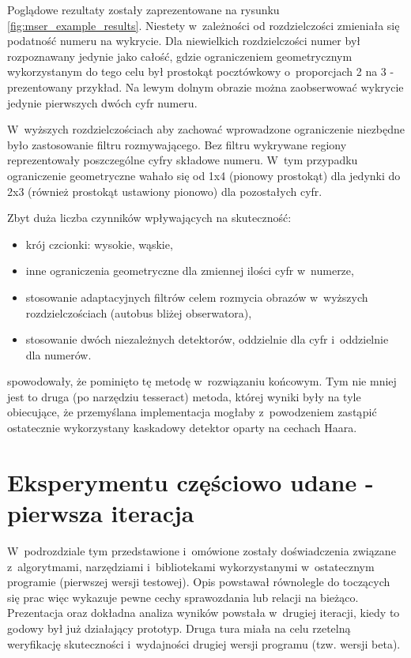 Poglądowe rezultaty zostały zaprezentowane na rysunku
\ref{fig:mser_example_results}.
Niestety w~zależności od rozdzielczości zmieniała się podatność
numeru na wykrycie. Dla niewielkich rozdzielczości numer był rozpoznawany
jedynie jako całość, gdzie ograniczeniem geometrycznym wykorzystanym
do tego celu był prostokąt pocztówkowy o~proporcjach 2 na 3 - prezentowany
przykład. Na lewym dolnym obrazie można zaobserwować wykrycie jedynie
pierwszych dwóch cyfr numeru.

W~wyższych rozdzielczościach aby zachować wprowadzone ograniczenie
niezbędne było zastosowanie filtru rozmywającego. Bez filtru
wykrywane regiony reprezentowały poszczególne cyfry składowe numeru.
W~tym przypadku ograniczenie geometryczne wahało się od 1x4 (pionowy
prostokąt) dla jedynki do 2x3 (również prostokąt ustawiony pionowo) dla
pozostałych cyfr.

Zbyt duża liczba czynników wpływających na skuteczność:

\begin{itemize}
    \item krój czcionki: wysokie, wąskie,
    \item inne ograniczenia geometryczne dla zmiennej ilości cyfr
        w~numerze,
    \item stosowanie adaptacyjnych filtrów celem rozmycia obrazów
        w~wyższych rozdzielczościach (autobus bliżej obserwatora),
    \item stosowanie dwóch niezależnych detektorów, oddzielnie dla
        cyfr i~oddzielnie dla numerów.
\end{itemize}

spowodowały, że pominięto tę metodę w~rozwiązaniu końcowym.
Tym nie mniej jest to druga (po narzędziu tesseract) metoda, której
wyniki były na tyle obiecujące, że przemyślana implementacja
mogłaby z~powodzeniem zastąpić ostatecznie wykorzystany kaskadowy
detektor oparty na cechach Haara.


\section{Eksperymentu częściowo udane - pierwsza iteracja}

W~podrozdziale tym przedstawione i~omówione zostały doświadczenia
związane z~algorytmami, narzędziami i~bibliotekami wykorzystanymi
w~ostatecznym programie
(pierwszej wersji testowej). Opis powstawał równolegle
do toczących się prac więc wykazuje pewne cechy sprawozdania
lub relacji na bieżąco.
Prezentacja oraz dokładna analiza wyników powstała w~drugiej
iteracji, kiedy to godowy był już działający prototyp.
Druga tura miała na celu rzetelną weryfikację skuteczności
i~wydajności drugiej wersji programu (tzw. wersji beta).

